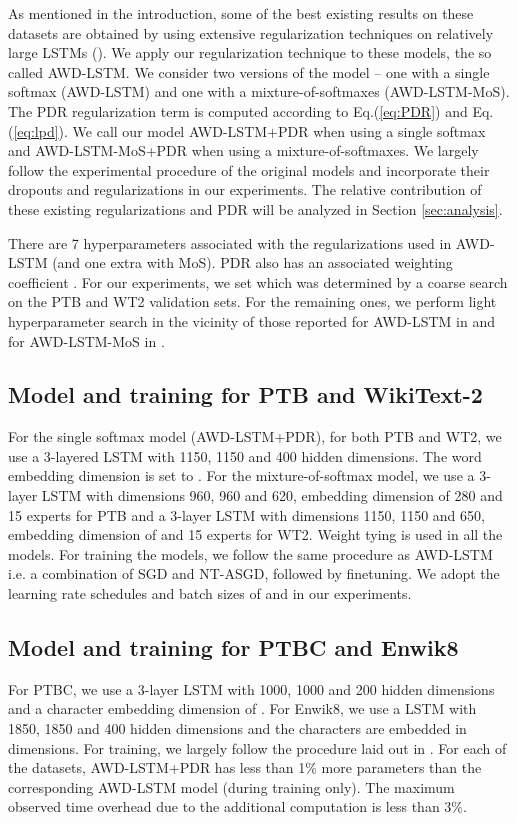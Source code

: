 \documentclass{article} \usepackage{iclr2019_conference,times}
\begin{document}
As mentioned in the introduction, some of the best existing results on these datasets are obtained by using extensive regularization techniques on  relatively large LSTMs (\cite{Merity2018,Merity2018AnAO,Yang2017BreakingTS}). We apply our regularization technique to these models, the so called AWD-LSTM. We consider two versions of the model -- one with a single softmax (AWD-LSTM) and one with a mixture-of-softmaxes (AWD-LSTM-MoS). The PDR regularization term is computed according to Eq.(\ref{eq:PDR}) and Eq.(\ref{eq:lpd}). We call our model AWD-LSTM+PDR when using a single softmax and AWD-LSTM-MoS+PDR when using a mixture-of-softmaxes. We largely follow the experimental procedure of the original models and incorporate their dropouts and regularizations in our experiments. The relative contribution of these existing regularizations and PDR will be analyzed in Section \ref{sec:analysis}. 

There are 7 hyperparameters associated with the regularizations used in AWD-LSTM (and one extra with MoS). PDR also has an associated weighting coefficient .  For our experiments, we set   which was determined by a coarse search on the PTB and WT2 validation sets.  For the remaining ones, we perform light hyperparameter search in the vicinity of those reported for AWD-LSTM in \cite{Merity2018,Merity2018AnAO} and for AWD-LSTM-MoS in \cite{Yang2017BreakingTS}. 








\subsection{Model and training for PTB and WikiText-2}
For the single softmax model (AWD-LSTM+PDR), for both PTB and WT2, we use a 3-layered LSTM with 1150, 1150 and 400 hidden dimensions. The word embedding dimension is set to .  For the mixture-of-softmax model,  we use a 3-layer LSTM with dimensions 960, 960 and 620, embedding dimension of 280 and 15 experts for PTB and a 3-layer LSTM with dimensions 1150, 1150 and 650, embedding dimension of  and 15 experts for WT2.  Weight tying is used in all the models. For training the models, we follow the same procedure as AWD-LSTM i.e. a combination of SGD and NT-ASGD, followed by finetuning. We adopt the learning rate schedules and batch sizes of  \cite{Merity2018} and  \cite{Yang2017BreakingTS} in our experiments.


\subsection{Model and training for PTBC and Enwik8}
For  PTBC, we use a 3-layer LSTM with 1000, 1000 and 200 hidden dimensions and a character embedding dimension of . For  Enwik8, we use a LSTM with 1850, 1850 and 400 hidden dimensions and the characters are embedded in  dimensions. 
For training, we largely follow the procedure laid out in \cite{Merity2018AnAO}.
For each of the datasets, AWD-LSTM+PDR has less than 1\% more parameters than the corresponding AWD-LSTM model (during training only). The maximum observed time overhead due to the additional computation is less than 3\%. 
\end{document}
